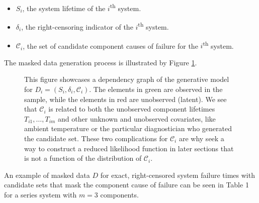 \documentclass[
]{article}
\providecommand{\tightlist}{%
  \setlength{\itemsep}{0pt}\setlength{\parskip}{0pt}}
\begin{document}
\begin{itemize}
\tightlist
\item
  \(S_i\), the system lifetime of the \(i\)\textsuperscript{th} system.
\item
  \(\delta_i\), the right-censoring indicator of the
  \(i\)\textsuperscript{th} system.
\item
  \(\mathcal{C}_i\), the set of candidate component causes of failure
  for the \(i\)\textsuperscript{th} system.
\end{itemize}

The masked data generation process is illustrated by Figure
\ref{fig:figureone}.

\begin{figure}[h]
\centering{
\resizebox{0.5\textwidth}{!}{}}
\caption{This figure showcases a dependency graph of the generative model for
$D_i = (S_i,\delta_i,\mathcal{C}_i)$. The elements in green are observed in the sample,
while the elements in red are unobserved (latent). We see that $\mathcal{C}_i$ is
related to both the unobserved component lifetimes $T_{i 1},\ldots,T_{i m}$ and
other unknown and unobserved covariates, like ambient temperature or the
particular diagnostician who generated the candidate set. These two complications
for $\mathcal{C}_i$ are why seek a way to construct a reduced likelihood function
in later sections that is not a function of the distribution of $\mathcal{C}_i$.}
\label{fig:figureone}
\end{figure}

An example of masked data \(D\) for exact, right-censored system failure
times with candidate sets that mask the component cause of failure can
be seen in Table 1 for a series system with \(m=3\) components.
\end{document}
